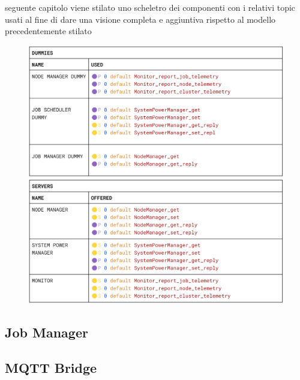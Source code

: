 seguente capitolo viene stilato uno scheletro dei componenti con i relativi topic usati al fine di dare una visione completa e aggiuntiva rispetto al modello precedentemente stilato  
\begin{figure}[H]
    \centering
    \includegraphics[width=\textwidth]{./img/dummies_skeleton.png}
    \includegraphics[width=\textwidth]{./img/server_skeleton.png}
\end{figure}
\subsection{Job Manager}
\subsection{MQTT Bridge}